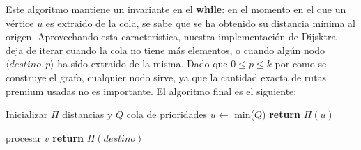 Este algoritmo mantiene un invariante en el \textbf{while}: en el momento en el que un vértice $u$ es extraido de la cola, se sabe que se ha obtenido su distancia mínima al origen. Aprovechando esta característica, nuestra implementación de Dijsktra deja de iterar cuando la cola no tiene más elementos, o cuando algún nodo $\langle destino, p \rangle$ ha sido extraido de la misma. Dado que $0 \leq p \leq k$ por como se construye el grafo, cualquier nodo sirve, ya que la cantidad exacta de rutas premium usadas no es importante. El algoritmo final es el siguiente:

\begin{algorithm}
\begin{algorithmic}[H]


    \State Inicializar $\Pi$ distancias y $Q$ cola de prioridades
        \State $u \gets$ min($Q$)        
            \State \textbf{return} $\Pi(u)$
        \EndIf
        

        
\end{algorithmic}
\end{algorithm}

\begin{algorithm}
\begin{algorithmic}


        
        
            \State procesar $v$
        \EndFor
    \EndWhile
    \State \textbf{return} $\Pi(destino)$
\EndFunction

\end{algorithmic}
\end{algorithm}


